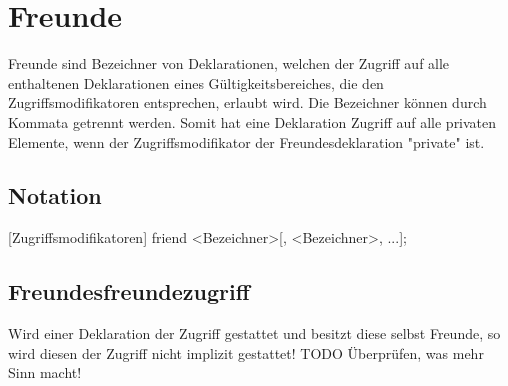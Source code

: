 \chapter{Freunde}
Freunde sind Bezeichner von Deklarationen, welchen der Zugriff auf alle enthaltenen Deklarationen eines Gültigkeitsbereiches,
die den Zugriffsmodifikatoren entsprechen, erlaubt wird.
Die Bezeichner können durch Kommata getrennt werden.
Somit hat eine Deklaration Zugriff auf alle privaten Elemente, wenn der Zugriffsmodifikator der Freundesdeklaration "private" ist.

\section{Notation} 
[Zugriffsmodifikatoren] friend <Bezeichner>[, <Bezeichner>, ...];

\section{Freundesfreundezugriff}
Wird einer Deklaration der Zugriff gestattet und besitzt diese selbst Freunde, so wird diesen der Zugriff nicht implizit gestattet!
TODO Überprüfen, was mehr Sinn macht!